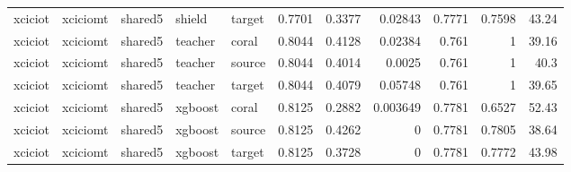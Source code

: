 \begin{table}
\begin{tabular}{lllllrrrrrr}
xciciot & xciciomt & shared5 & shield & target & 0.7701 & 0.3377 & 0.02843 & 0.7771 & 0.7598 & 43.24 \\
xciciot & xciciomt & shared5 & teacher & coral & 0.8044 & 0.4128 & 0.02384 & 0.761 & 1 & 39.16 \\
xciciot & xciciomt & shared5 & teacher & source & 0.8044 & 0.4014 & 0.0025 & 0.761 & 1 & 40.3 \\
xciciot & xciciomt & shared5 & teacher & target & 0.8044 & 0.4079 & 0.05748 & 0.761 & 1 & 39.65 \\
xciciot & xciciomt & shared5 & xgboost & coral & 0.8125 & 0.2882 & 0.003649 & 0.7781 & 0.6527 & 52.43 \\
xciciot & xciciomt & shared5 & xgboost & source & 0.8125 & 0.4262 & 0 & 0.7781 & 0.7805 & 38.64 \\
xciciot & xciciomt & shared5 & xgboost & target & 0.8125 & 0.3728 & 0 & 0.7781 & 0.7772 & 43.98 \\
\bottomrule
\end{tabular}
\end{table}
